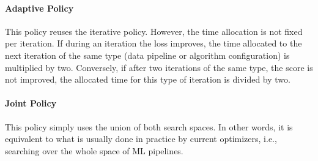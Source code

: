 \paragraph{Adaptive Policy}
This policy reuses the iterative policy.
However, the time allocation is not fixed per iteration.
If during an iteration the loss improves, the time allocated to the next iteration of the same type (data pipeline or algorithm configuration) is multiplied by two.
Conversely, if after two iterations of the same type, the score is not improved, the allocated time for this type of iteration is divided by two.

\paragraph{Joint Policy}
This policy simply uses the union of both search spaces.
In other words, it is equivalent to what is usually done in practice by current optimizers, i.e., searching over the whole space of ML pipelines.







